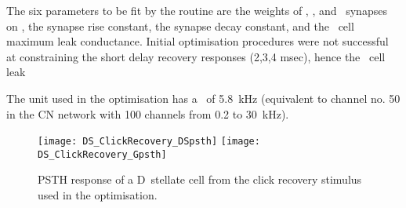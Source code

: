 The six parameters to be fit by the routine are the weights of \GLG\@, \HSR\@, and \LSR~synapses on \DS, the \GABAa synapse rise constant, the \GABAa synapse decay constant, and the \DS~cell maximum leak conductance.
Initial optimisation procedures were not successful at constraining the short delay recovery responses (2,3,4 msec), hence the \DS~cell leak %

The unit used in the optimisation has a \CF~of 5.8~kHz (equivalent to channel no. 50 in the CN network with 100 channels from 0.2 to 30~kHz).

\begin{figure}[htb]
  \centering
  \texttt{[image: DS\_ClickRecovery\_DSpsth]}%
  \texttt{[image: DS\_ClickRecovery\_Gpsth]}%
  \caption[PSTH response to click recovery stimulus]{PSTH response of a D~stellate cell from the click recovery stimulus used in the optimisation. }\label{fig:ClickExamples}
\end{figure}











